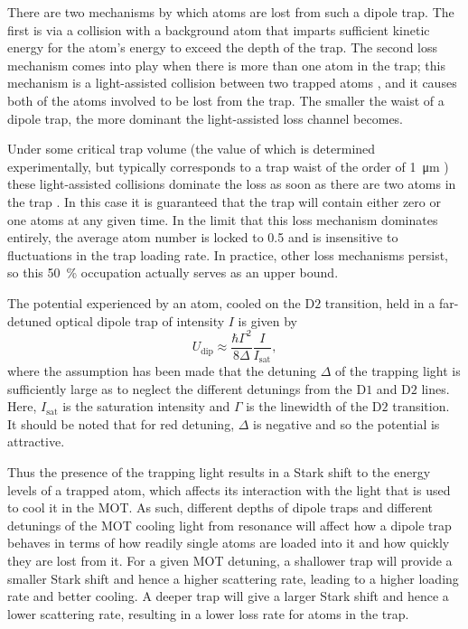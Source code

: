 \documentclass[../Thesis-IJspeert.tex]{subfiles}
\begin{document}
There are two mechanisms by which atoms are lost from such a dipole trap. The first is via a collision with a background atom that imparts sufficient kinetic energy for the atom's energy to exceed the depth of the trap. The second loss mechanism comes into play when there is more than one atom in the trap; this mechanism is a light-assisted collision between two trapped atoms \cite{fuhrmanek2012}, and it causes both of the atoms involved to be lost from the trap. The smaller the waist of a dipole trap, the more dominant the light-assisted loss channel becomes. 

Under some critical trap volume (the value of which is determined experimentally, but typically corresponds to a trap waist of the order of \SI{1}{\micro\metre} \cite{fung2015a}) these light-assisted collisions dominate the loss as soon as there are two atoms in the trap \cite{schlosser2002a}. In this case it is guaranteed that the trap will contain either zero or one atoms at any given time. In the limit that this loss mechanism dominates entirely, the average atom number is locked to \num{0.5} and is insensitive to fluctuations in the trap loading rate. In practice, other loss mechanisms persist, so this \SI{50}{\percent} occupation actually serves as an upper bound.

The potential experienced by an  atom, cooled on the $\mathrm{D}2$ transition, held in a far-detuned optical dipole trap of intensity $I$ is given by
\begin{equation}\label{eq:dipPot}
U_{\mathrm{dip}} \approx \frac{\hbar\Gamma^2}{8\Delta}\frac{I}{I_{\mathrm{sat}}},
\end{equation}
where the assumption has been made that the detuning $\Delta$ of the trapping light is sufficiently large as to neglect the different detunings from the $\mathrm{D}1$ and $\mathrm{D}2$ lines. Here, $I_{\mathrm{sat}}$ is the saturation intensity and $\Gamma$ is the linewidth of the $\mathrm{D}2$ transition. It should be noted that for red detuning, $\Delta$ is negative and so the potential is attractive.  

Thus the presence of the trapping light results in a Stark shift to the energy levels of a trapped atom, which affects its interaction with the light that is used to cool it in the MOT. As such, different depths of dipole traps and different detunings of the MOT cooling light from resonance will affect how a dipole trap behaves in terms of how readily single atoms are loaded into it and how quickly they are lost from it. For a given MOT detuning, a shallower trap will provide a smaller Stark shift and hence a higher scattering rate, leading to a higher loading rate and better cooling. A deeper trap will give a larger Stark shift and hence a lower scattering rate, resulting in a lower loss rate for atoms in the trap. 
\end{document}
